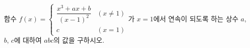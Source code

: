 함수 $f(x)=\begin{cases} \dfrac{x^3+ax+b}{(x-1)^2} & (x\ne 1) \\ c & (x=1) \end{cases}$가 $x=1$에서 연속이 되도록 하는 상수 $a$, $b$, $c$에 대하여 $abc$의 값을 구하시오.
